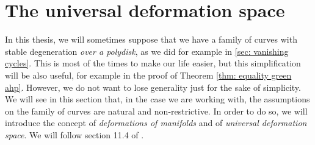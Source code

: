 \documentclass[a4paper,12 pt,titlepage,twoside]{book}
\theoremstyle{plain}
\theoremstyle{theorem}
\theoremstyle{definition}
\theoremstyle{remark}
\begin{document}
\section{The universal deformation space}\label{sec: uni def space}
In this thesis, we will sometimes suppose that we have a family of curves with stable degeneration \emph{over a polydisk}, as we did for example in \ref{sec: vanishing cycles}. This is most of the times to make our life easier, but this simplification will be also useful, for example in the proof of Theorem \ref{thm: equality green ahp}. However, we do not want to lose generality just for the sake of simplicity. We will see in this section that, in the case we are working with, the assumptions on the family of curves are natural and non-restrictive. In order to do so, we will introduce the concept of \emph{deformations of manifolds} and of \emph{universal deformation space}. We will follow section 11.4 of \cite{MR2807457}.
\end{document}
